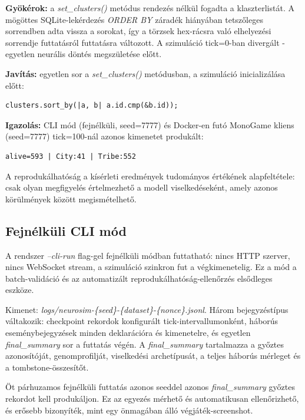 \textbf{Gyökérok:} a \textit{set\_clusters()} metódus rendezés nélkül fogadta
a klaszterlistát. A mögöttes SQLite-lekérdezés \textit{ORDER BY} záradék hiányában
tetszőleges sorrendben adta vissza a sorokat, így a törzsek hex-rácsra való
elhelyezési sorrendje futtatásról futtatásra változott.
A szimuláció tick=0-ban divergált - egyetlen neurális döntés megszületése előtt.

\textbf{Javítás:} egyetlen sor a \textit{set\_clusters()} metódusban,
a szimuláció inicializálása előtt:

\begin{lstlisting}[language={},caption={Determinizmus-javítás: klaszterek rendezése azonosító szerint}]
clusters.sort_by(|a, b| a.id.cmp(&b.id));
\end{lstlisting}

\textbf{Igazolás:} CLI mód (fejnélküli, seed=7777) és Docker-en futó MonoGame kliens
(seed=7777) tick=100-nál azonos kimenetet produkált:

\begin{lstlisting}[language={},caption={Determinizmus-ellenőrzés: CLI és MonoGame egyező eredménye tick=100-nál}]
alive=593 | City:41 | Tribe:552
\end{lstlisting}

A reprodukálhatóság a kísérleti eredmények tudományos értékének alapfeltétele:
csak olyan megfigyelés értelmezhető a modell viselkedéseként, amely azonos
körülmények között megismételhető.

\subsection*{Fejnélküli CLI mód}

A rendszer \textit{--cli-run} flag-gel fejnélküli módban futtatható:
nincs HTTP szerver, nincs WebSocket stream, a szimuláció szinkron fut
a végkimenetelig. Ez a mód a batch-validáció és az automatizált reprodukálhatóság-ellenőrzés
elsődleges eszköze.

Kimenet: \textit{logs/neurosim-\{seed\}-\{dataset\}-\{nonce\}.jsonl}.
Három bejegyzéstípus váltakozik: checkpoint rekordok konfigurált tick-intervallumonként,
háborús eseménybejegyzések minden deklarációra és kimenetelre,
és egyetlen \textit{final\_summary} sor a futtatás végén.
A \textit{final\_summary} tartalmazza a győztes azonosítóját, genomprofilját,
viselkedési archetípusát, a teljes háborús mérleget és a tombstone-összesítőt.

Öt párhuzamos fejnélküli futtatás azonos seeddel azonos \textit{final\_summary}
győztes rekordot kell produkáljon. Ez az egyezés mérhető és automatikusan ellenőrizhető,
és erősebb bizonyíték, mint egy önmagában álló végjáték-screenshot.

